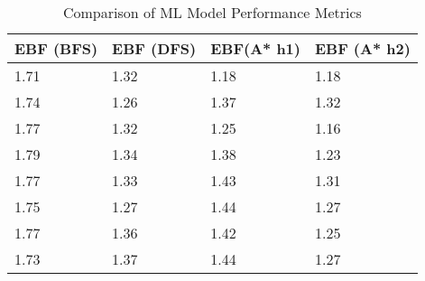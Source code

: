 \begin{table}[htbp]
\caption{Comparison of ML Model Performance Metrics}
\label{tab:model_comparison}
\begin{tabular}{|l|l|l|l|}
\toprule
EBF (BFS) & EBF (DFS) & EBF(A* h1) & EBF (A* h2) \\
\midrule
1.71 & 1.32 & 1.18 & 1.18 \\
1.74 & 1.26 & 1.37 & 1.32 \\
1.77 & 1.32 & 1.25 & 1.16 \\
1.79 & 1.34 & 1.38 & 1.23 \\
1.77 & 1.33 & 1.43 & 1.31 \\
1.75 & 1.27 & 1.44 & 1.27 \\
1.77 & 1.36 & 1.42 & 1.25 \\
1.73 & 1.37 & 1.44 & 1.27 \\
\bottomrule
\end{tabular}
\end{table}
